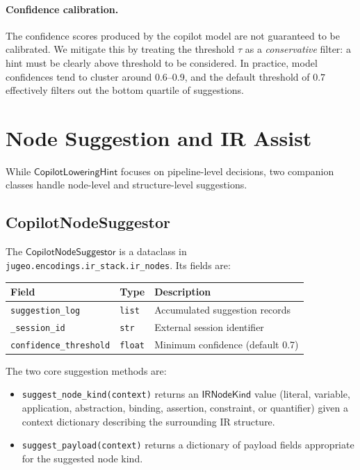 \documentclass[11pt]{article}
\newcommand{\CLH}{\mathsf{CopilotLoweringHint}}
\newcommand{\CNS}{\mathsf{CopilotNodeSuggestor}}
\begin{document}
\paragraph{Confidence calibration.}
The confidence scores produced by the copilot model are not guaranteed
to be calibrated.  We mitigate this by treating the threshold $\tau$
as a \emph{conservative} filter: a hint must be clearly above threshold
to be considered.  In practice, model confidences tend to cluster around
0.6--0.9, and the default threshold of $0.7$
effectively filters out the bottom quartile of suggestions.

\section{Node Suggestion and IR Assist}\label{sec:nodeassist}

While $\CLH$ focuses on pipeline-level decisions, two companion
classes handle node-level and structure-level suggestions.

\subsection{CopilotNodeSuggestor}\label{sec:cns}

The $\CNS$ is a dataclass in
\texttt{jugeo.encodings.ir\_stack.ir\_nodes}.  Its fields are:

\begin{center}
\begin{tabular}{l l p{6.5cm}}
\hline
\textbf{Field} & \textbf{Type} & \textbf{Description} \\
\hline
\texttt{suggestion\_log}       & \texttt{list}  & Accumulated
  suggestion records \\
\texttt{\_session\_id}         & \texttt{str}   & External session
  identifier \\
\texttt{confidence\_threshold} & \texttt{float} & Minimum confidence
  (default 0.7) \\
\hline
\end{tabular}
\end{center}

The two core suggestion methods are:

\begin{itemize}
\item \texttt{suggest\_node\_kind(context)} returns an
  $\mathsf{IRNodeKind}$ value (literal, variable, application,
  abstraction, binding, assertion, constraint, or quantifier)
  given a context dictionary describing the surrounding IR structure.
\item \texttt{suggest\_payload(context)} returns a dictionary of
  payload fields appropriate for the suggested node kind.
\end{itemize}
\end{document}
